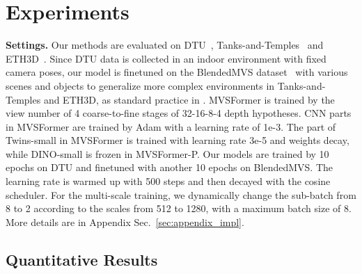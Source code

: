 \documentclass[10pt]{article} \usepackage[preprint]{tmlr}
\begin{document}
\section{Experiments}
\label{sec:implementation_details}
\noindent\textbf{Settings.}
Our methods are evaluated on DTU~\citep{aanaes2016large}, Tanks-and-Temples~\citep{Knapitsch2017} and ETH3D~\citep{schops2017multi}.
Since DTU data is collected in an indoor environment with fixed camera poses, our model is finetuned on the BlendedMVS dataset~\citep{yao2020blendedmvs} with various scenes and objects to generalize more complex environments in Tanks-and-Temples and ETH3D, as standard practice in \citet{giang2021curvature,ding2021transmvsnet}.
MVSFormer is trained by the view number  of 4 coarse-to-fine stages of 32-16-8-4 depth hypotheses. 
CNN parts in MVSFormer are trained by Adam with a learning rate of 1e-3.
The part of Twins-small in MVSFormer is trained with learning rate 3e-5 and  weights decay, while DINO-small is frozen in MVSFormer-P.
Our models are trained by 10 epochs on DTU and finetuned with another 10 epochs on BlendedMVS. The learning rate is warmed up with 500 steps and then decayed with the cosine scheduler. For the multi-scale training, we dynamically change the sub-batch from 8 to 2 according to the scales from 512 to 1280, with a maximum batch size of 8. 
More details are in Appendix Sec.~\ref{sec:appendix_impl}.


\subsection{Quantitative Results}
\label{sec:quantitative}

\begin{table}
\vspace{-0.1in}
\small 
\caption{Quantitative point cloud results (mm) on DTU (lower is better). Best results are in bold, and second ones are underlined. * denotes that GBiNet is re-tested with the same post-processing threshold to all scans for fair comparisons with other methods. 
\label{tab:quant_DTU}}
\centering
{}
\vspace{-0.1in}
\end{table}
\end{document}
